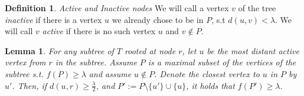 \documentclass[11pt,a4paper]{article}
\newtheorem{lemma}{Lemma}
\theoremstyle{definition}
\newtheorem{definition}{Definition}
\theoremstyle{remark}
\begin{document}
\begin{definition}
\emph{Active and Inactive nodes} We will call a vertex $v$ of the tree \emph{inactive} if there is a vertex $u$ we already chose to be in $P$, s.t $d(u,v)<\lambda$. We will call $v$ \emph{active} if there is no such vertex $u$ and $v \notin P$.
\end{definition}
\begin{lemma} \label{greenNodesLemma}
For any subtree of $T$ rooted at node $r$, let $u$ be the most distant active vertex from $r$ in the subtree. Assume $P$ is a maximal subset of the vertices of the subtree s.t. $f(P)\geq\lambda$ and assume $u \notin P$. Denote the closest vertex to $u$ in $P$ by $u'$. Then, if $d(u,r)\ge\frac{\lambda}{2}$, and $P' := P \setminus \lbrace u' \rbrace \cup \lbrace u \rbrace$, it holds that $f(P')\geq\lambda$.
\end{lemma}
\end{document}
